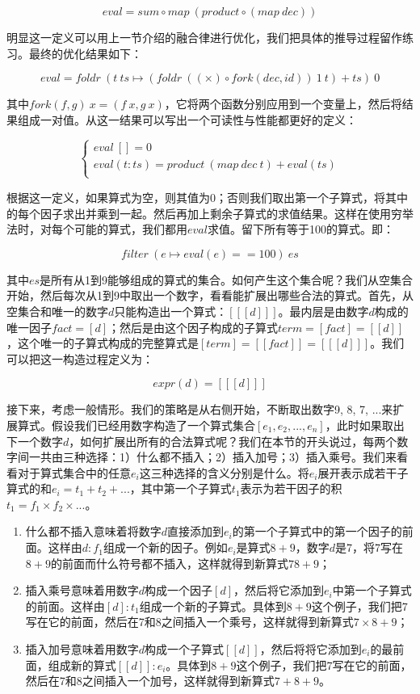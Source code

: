 \documentclass{article}
\begin{document}
\[
eval = sum \circ map\ (product \circ (map\ dec))
\]

明显这一定义可以用上一节介绍的融合律进行优化，我们把具体的推导过程留作练习。最终的优化结果如下：

\[
eval = foldr\ (t\ ts \mapsto (foldr\ ((\times) \circ fork(dec, id))\ 1\ t) + ts)\ 0
\]

其中$fork(f, g)\ x = (f\ x, g\ x)$，它将两个函数分别应用到一个变量上，然后将结果组成一对值。从这一结果可以写出一个可读性与性能都更好的定义：

\[
\begin{cases}
eval\ [] = 0 \\
eval (t:ts) = product\ (map\ dec\ t) + eval(ts) \\
\end{cases}
\]

根据这一定义，如果算式为空，则其值为0；否则我们取出第一个子算式，将其中的每个因子求出并乘到一起。然后再加上剩余子算式的求值结果。这样在使用穷举法时，对每个可能的算式，我们都用$eval$求值。留下所有等于100的算式。即：

\[
filter\ (e \mapsto eval(e) == 100)\ es
\]

其中$es$是所有从1到9能够组成的算式的集合。如何产生这个集合呢？我们从空集合开始，然后每次从1到9中取出一个数字，看看能扩展出哪些合法的算式。首先，从空集合和唯一的数字$d$只能构造出一个算式：$[[[d]]]$。最内层是由数字$d$构成的唯一因子$fact = [d]$；然后是由这个因子构成的子算式$term = [fact] = [[d]]$，这个唯一的子算式构成的完整算式是$[term] = [[fact]] = [[[d]]]$。我们可以把这一构造过程定义为：

\[
expr(d) = [[[d]]]
\]

接下来，考虑一般情形。我们的策略是从右侧开始，不断取出数字9, 8, 7, ...来扩展算式。假设我们已经用数字构造了一个算式集合$[e_1, e_2, ..., e_n]$，此时如果取出下一个数字$d$，如何扩展出所有的合法算式呢？我们在本节的开头说过，每两个数字间一共由三种选择：1）什么都不插入；2）插入加号；3）插入乘号。我们来看看对于算式集合中的任意$e_i$这三种选择的含义分别是什么。将$e_i$展开表示成若干子算式的和$e_i = t_1 + t_2 + ...$，其中第一个子算式$t_1$表示为若干因子的积$t_1 = f_1 \times f_2 \times ...$。

\begin{enumerate}
\item 什么都不插入意味着将数字$d$直接添加到$e_i$的第一个子算式中的第一个因子的前面。这样由$d:f_1$组成一个新的因子。例如$e_i$是算式$8 + 9$，数字$d$是7，将7写在$8+9$的前面而什么符号都不插入，这样就得到新算式$78 + 9$；
\item 插入乘号意味着用数字$d$构成一个因子$[d]$，然后将它添加到$e_i$中第一个子算式的前面。这样由$[d]:t_1$组成一个新的子算式。具体到$8 + 9$这个例子，我们把7写在它的前面，然后在7和8之间插入一个乘号，这样就得到新算式$7 \times 8 + 9$；
\item 插入加号意味着用数字$d$构成一个子算式$[[d]]$，然后将将它添加到$e_i$的最前面，组成新的算式$[[d]]:e_i$。具体到$8 + 9$这个例子，我们把7写在它的前面，然后在7和8之间插入一个加号，这样就得到新算式$7 + 8 + 9$。
\end{enumerate}
\end{document}
